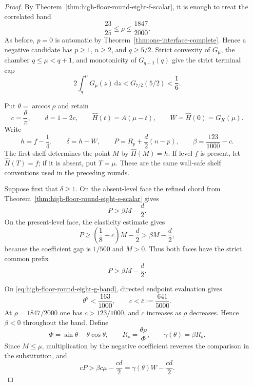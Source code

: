 \documentclass[11pt]{article}
\theoremstyle{remark}
\newcommand{\dd}{\,\mathrm d}
\begin{document}
\begin{proof}
By Theorem~\ref{thm:high-floor-round-eight-f-scalar}, it is enough to
treat the correlated band
\begin{equation}
 \frac{23}{25}\leq\rho\leq\frac{1847}{2000}.
 \label{eq:high-floor-round-eight-g-band}
\end{equation}
As before, $p=0$ is automatic by
Theorem~\ref{thm:one-interface-complete}.  Hence a negative candidate has
$p\geq1$, $n\geq2$, and $q\geq5/2$.  Strict convexity of $G_\mu$, the
chamber $q\leq\mu<q+1$, and monotonicity of $G_{q+1}(q)$ give the strict
terminal cap
\begin{equation}
 \boxed{2\int_q^\mu G_\mu(z)\dd z
 <G_{7/2}(5/2)<\frac16.}
 \label{eq:high-floor-round-eight-g-cap}
\end{equation}

Put $\theta=\arccos\rho$ and retain
\[
 c=\frac{\theta}{\pi},\qquad d=1-2c,\qquad
 \widehat H(t)=A(\mu-t),\qquad
 W=\widehat H(0)=G_K(\mu).
\]
Write
\[
 h=f-\frac14,\qquad \delta=h-W,\qquad
 P=R_p+\frac d2(n-p),\qquad
 \beta=\frac{123}{1000}-c.
\]
The first shelf determines the point $M$ by $\widehat H(M)=h$.
If level $f$ is present, let $\widehat H(T)=f$; if it is absent, put
$T=\mu$.  These are the same wall-safe shelf conventions used in the
preceding rounds.

Suppose first that $\delta\geq1$.  On the absent-level face the refined
chord from Theorem~\ref{thm:high-floor-round-eight-e-scalar} gives
\[
 P>\beta M-\frac d2.
\]
On the present-level face, the elasticity estimate gives
\[
 P\geq\left(\frac18-c\right)M-\frac d2
 >\beta M-\frac d2,
\]
because the coefficient gap is $1/500$ and $M>0$.  Thus both faces have
the strict common prefix
\begin{equation}
 \boxed{P>\beta M-\frac d2.}
 \label{eq:high-floor-round-eight-g-common-prefix}
\end{equation}

On \eqref{eq:high-floor-round-eight-g-band}, directed endpoint
evaluation gives
\begin{equation}
 \theta^2<\frac{163}{1000},\qquad
 c<\bar c:=\frac{641}{5000}.
 \label{eq:high-floor-round-eight-g-ratio}
\end{equation}
At $\rho=1847/2000$ one has $c>123/1000$, and $c$ increases as
$\rho$ decreases.  Hence $\beta<0$ throughout the band.  Define
\begin{equation}
 \Phi=\sin\theta-\theta\cos\theta,\qquad
 R_\rho=\frac{\theta\rho}{\Phi},\qquad
 \gamma(\theta)=\beta R_\rho.
 \label{eq:high-floor-round-eight-g-gamma}
\end{equation}
Since $M\leq\mu$, multiplication by the negative coefficient reverses
the comparison in the substitution, and
\begin{equation}
 cP>\beta c\mu-\frac{cd}{2}
 =\boxed{\gamma(\theta)W-\frac{cd}{2}.}
 \label{eq:high-floor-round-eight-g-correlated-prefix}
\end{equation}


\end{proof}
\end{document}
